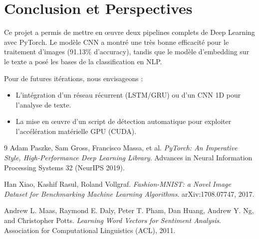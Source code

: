 \documentclass[12pt,a4paper,oneside]{report}
\begin{document}
\section{Conclusion et Perspectives}
Ce projet a permis de mettre en œuvre deux pipelines complets de Deep Learning avec PyTorch. Le modèle CNN a montré une très bonne efficacité pour le traitement d'images (91.13\% d'accuracy), tandis que le modèle d'embedding sur le texte a posé les bases de la classification en NLP.

Pour de futures itérations, nous envisageons :
\begin{itemize}
    \item L'intégration d'un réseau récurrent (LSTM/GRU) ou d'un CNN 1D pour l'analyse de texte.
    \item La mise en œuvre d'un script de détection automatique pour exploiter l'accélération matérielle GPU (CUDA).
\end{itemize}

\begin{thebibliography}{9}
  Adam Paszke, Sam Gross, Francisco Massa, et al.
  \emph{PyTorch: An Imperative Style, High-Performance Deep Learning Library}.
  Advances in Neural Information Processing Systems 32 (NeurIPS 2019).

  Han Xiao, Kashif Rasul, Roland Vollgraf.
  \emph{Fashion-MNIST: a Novel Image Dataset for Benchmarking Machine Learning Algorithms}.
  arXiv:1708.07747, 2017.

  Andrew L. Maas, Raymond E. Daly, Peter T. Pham, Dan Huang, Andrew Y. Ng, and Christopher Potts.
  \emph{Learning Word Vectors for Sentiment Analysis}.
  Association for Computational Linguistics (ACL), 2011.
\end{thebibliography}
\end{document}
